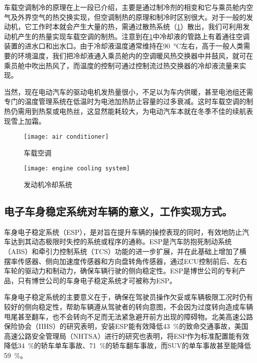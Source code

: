 \documentclass[UTF8]{ctexart}
\numberwithin{figure}{section}
\numberwithin{table}{section}
\begin{document}
车载空调制冷的原理在上一段已介绍，主要是通过制冷剂的相变和它与乘员舱内空气及外界空气的热交换实现，但空调制热的原理和制冷时区别很大。对于一般的发动机，它工作时本就会产生大量的热，需通过散热系统（\cref{engine cooling system}）散出，我们可利用发动机产生的热量实现车载空调的制热。注意到在\cref{engine cooling system}中冷却液的管路上有着通往空调装置的进水口和出水口。由于冷却液温度通常维持在\SI{90}{\celsius}左右，高于一般人类需要的环境温度，我们把冷却液通入乘员舱内的空调暖风热交换器中并鼓风，就可在乘员舱中吹出热风了，而温度的控制可通过控制流过热交换器的冷却液流量来实现。

当然，现在电动汽车的驱动电机发热量很小，不足以为车内供暖，甚至电池组还需专门的温度管理系统在低温时为电池加热防止容量的过多衰减。这时车载空调的制热仍需用到热泵或电热丝，这显然能耗较大，为电动汽车本就在冬季不佳的续航表现雪上加霜。

\begin{figure}[htbp]
	\centering
	\begin{minipage}[b]{0.8\textwidth}
		\centering
		\texttt{[image: air conditioner]}
		\caption{车载空调}
		\label{air conditioner}
	\end{minipage}
	\begin{minipage}[b]{\textwidth}
		\centering
		\texttt{[image: engine cooling system]}
		\caption{发动机冷却系统}
		\label{engine cooling system}
	\end{minipage}
\end{figure}

\subsection{电子车身稳定系统对车辆的意义，工作实现方式。}

车身电子稳定系统（ESP），是对旨在提升车辆的操控表现的同时，有效地防止汽车达到其动态极限时失控的系统或程序的通称。ESP是汽车防抱死制动系统（ABS）和牵引力控制系统（TCS）功能的进一步扩展，并在此基础上增加了横摆率传感器、侧向加速度传感器和方向盘转角传感器，通过ECU控制前后、左右车轮的驱动力和制动力，确保车辆行驶的侧向稳定性。ESP是博世公司的专利产品，只有博世公司的车身电子稳定系统才可被称为ESP。

车身电子稳定系统的主要意义在于，确保在驾驶员操作欠妥或车辆极限工况时仍有较好的侧向稳定性，帮助车辆遵从驾驶者的转向意图，不会因为过度转向造成车辆甩尾甚至翻车，也不会转向不足而无法紧急避开前方出现的障碍物。北美高速公路保险协会（IIHS）的研究表明，安装ESP能有效降低\SI{43}{\percent}的致命交通事故，美国高速公路安全管理局（NHTSA）进行的研究也表明，将ESP作为标准配置能有效降低\SI{34}{\percent}的轿车单车事故、\SI{71}{\percent}的轿车翻车事故，而SUV的单车事故甚至能降低\SI{59}{\percent}。
\end{document}

